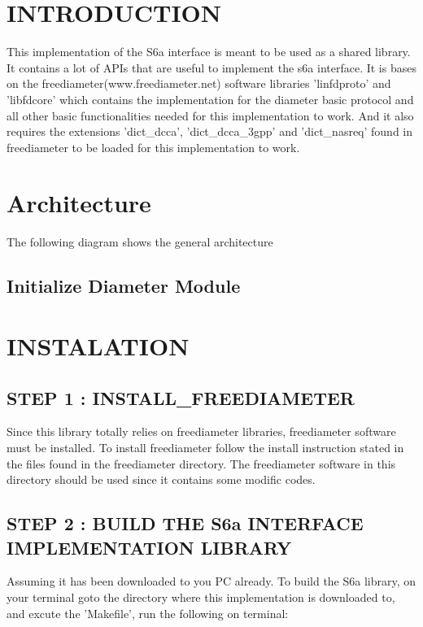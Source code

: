 \hypertarget{index_intro_sec}{}\section{\-I\-N\-T\-R\-O\-D\-U\-C\-T\-I\-O\-N}\label{index_intro_sec}
\-This implementation of the \-S6a interface is meant to be used as a shared library. \-It contains a lot of \-A\-P\-Is that are useful to implement the s6a interface. \-It is bases on the freediameter(www.\-freediameter.\-net) software libraries 'linfdproto' and 'libfdcore' which contains the implementation for the diameter basic protocol and all other basic functionalities needed for this implementation to work. \-And it also requires the extensions 'dict\-\_\-dcca', 'dict\-\_\-dcca\-\_\-3gpp' and 'dict\-\_\-nasreq' found in freediameter to be loaded for this implementation to work.\hypertarget{index_architechture}{}\section{\-Architecture}\label{index_architechture}
\-The following diagram shows the general architecture  \hypertarget{index_init}{}\subsection{\-Initialize Diameter Module}\label{index_init}
 \hypertarget{index_install_sec}{}\section{\-I\-N\-S\-T\-A\-L\-A\-T\-I\-O\-N}\label{index_install_sec}
\hypertarget{index_step1}{}\subsection{\-S\-T\-E\-P 1 \-: I\-N\-S\-T\-A\-L\-L\-\_\-\-F\-R\-E\-E\-D\-I\-A\-M\-E\-T\-E\-R}\label{index_step1}
\-Since this library totally relies on freediameter libraries, freediameter software must be installed. \-To install freediameter follow the install instruction stated in the files found in the freediameter directory. \-The freediameter software in this directory should be used since it contains some modific codes.\hypertarget{index_step2}{}\subsection{\-S\-T\-E\-P 2 \-: B\-U\-I\-L\-D T\-H\-E S6a I\-N\-T\-E\-R\-F\-A\-C\-E I\-M\-P\-L\-E\-M\-E\-N\-T\-A\-T\-I\-O\-N L\-I\-B\-R\-A\-R\-Y}\label{index_step2}
\-Assuming it has been downloaded to you \-P\-C already. \-To build the \-S6a library, on your terminal goto the directory where this implementation is downloaded to, and excute the '\-Makefile', run the following on terminal\-:

